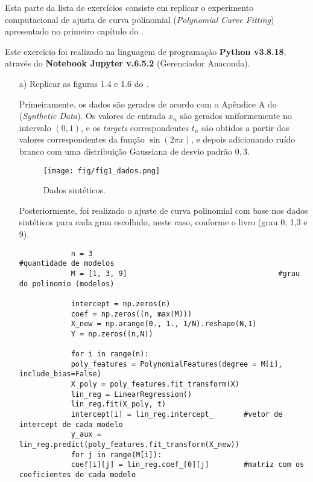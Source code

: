 \documentclass{article}
\begin{document}
 Esta parte da lista de exercícios consiste em replicar o experimento computacional de ajusta de curva polinomial (\textit{Polynomial Curve Fitting}) apresentado no primeiro capítulo do \cite{Bishop2006}.
 
 Este exercício foi realizado na linguagem de programação \textbf{Python v3.8.18}, através do \textbf{Notebook Jupyter v.6.5.2} (Gerenciador Anaconda).
 
  \begin{itemize}
  	\item [a)] Replicar as figuras 1.4 e 1.6 do \cite{Bishop2006}.
  	        
  	     Primeiramente, os dados são gerados de acordo com o Apêndice A do \cite{Bishop2006}(\textit{Synthetic Data}). Os valores de entrada $x_{n}$ são gerados uniformemente no intervalo $(0, 1)$, e os \textit{targets} correspondentes  $t_{n}$ são obtidos a partir dos valores correspondentes da função $\sin (2 \pi x)$, e depois adicionando ruído branco com uma distribuição Gaussiana de desvio padrão $0,3$.  
  	     
  	     \begin{figure}[ht]
  	     	\centering %
  	     	\texttt{[image: fig/fig1\_dados.png]} %
  	     	\caption{Dados sintéticos.} %
  	     	\label{dados} %
  	     \end{figure}  
  	        
  	     Posteriormente, foi realizado o ajuste de curva polinomial com base nos dados sintéticos para  cada grau escolhido, neste caso, conforme o livro (grau 0, 1,3 e 9). 
  	     
  	     
  	     \begin{verbatim}
  	     	n = 3                                           #quantidade de modelos
  	     	M = [1, 3, 9]                                   #grau do polinomio (modelos)
  	     
  	     	intercept = np.zeros(n)
  	     	coef = np.zeros((n, max(M)))
  	     	X_new = np.arange(0., 1., 1/N).reshape(N,1) 
  	     	Y = np.zeros((n,N))
  	     	
  	     	for i in range(n):
  	     	poly_features = PolynomialFeatures(degree = M[i], include_bias=False)
  	     	X_poly = poly_features.fit_transform(X)
  	     	lin_reg = LinearRegression()
  	     	lin_reg.fit(X_poly, t)
  	     	intercept[i] = lin_reg.intercept_       #vetor de intercept de cada modelo
  	     	y_aux = lin_reg.predict(poly_features.fit_transform(X_new))
  	     	for j in range(M[i]):
  	     	coef[i][j] = lin_reg.coef_[0][j]        #matriz com os coeficientes de cada modelo
  	     	

\end{verbatim}
\end{itemize}
\end{document}
